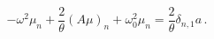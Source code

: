 \begin{equation}
-\omega^2\mu_n + \frac 2\theta (A\mu)_n +\omega_0^2\mu_n =
\frac 2\theta  \delta_{n,1} a \,.
\end{equation}

